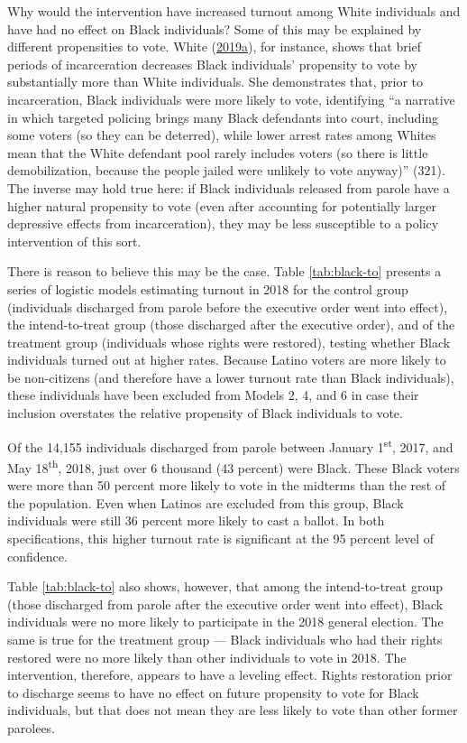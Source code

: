 \documentclass[
  12pt,
]{article}
\begin{document}
Why would the intervention have increased turnout among White individuals and have had no effect on Black individuals? Some of this may be explained by different propensities to vote. White (\protect\hyperlink{ref-White2019}{2019}\protect\hyperlink{ref-White2019}{a}), for instance, shows that brief periods of incarceration decreases Black individuals' propensity to vote by substantially more than White individuals. She demonstrates that, prior to incarceration, Black individuals were more likely to vote, identifying ``a narrative in which targeted policing brings many Black defendants into court, including some voters (so they can be deterred), while lower arrest rates among Whites mean that the White defendant pool rarely includes voters (so there is little demobilization, because the people jailed were unlikely to vote anyway)'' (321). The inverse may hold true here: if Black individuals released from parole have a higher natural propensity to vote (even after accounting for potentially larger depressive effects from incarceration), they may be less susceptible to a policy intervention of this sort.

There is reason to believe this may be the case. Table \ref{tab:black-to} presents a series of logistic models estimating turnout in 2018 for the control group (individuals discharged from parole before the executive order went into effect), the intend-to-treat group (those discharged after the executive order), and of the treatment group (individuals whose rights were restored), testing whether Black individuals turned out at higher rates. Because Latino voters are more likely to be non-citizens (and therefore have a lower turnout rate than Black individuals), these individuals have been excluded from Models 2, 4, and 6 in case their inclusion overstates the relative propensity of Black individuals to vote.



Of the 14,155 individuals discharged from parole between January 1\textsuperscript{st}, 2017, and May 18\textsuperscript{th}, 2018, just over 6 thousand (43 percent) were Black. These Black voters were more than 50 percent more likely to vote in the midterms than the rest of the population. Even when Latinos are excluded from this group, Black individuals were still 36 percent more likely to cast a ballot. In both specifications, this higher turnout rate is significant at the 95 percent level of confidence.

Table \ref{tab:black-to} also shows, however, that among the intend-to-treat group (those discharged from parole after the executive order went into effect), Black individuals were no more likely to participate in the 2018 general election. The same is true for the treatment group --- Black individuals who had their rights restored were no more likely than other individuals to vote in 2018. The intervention, therefore, appears to have a leveling effect. Rights restoration prior to discharge seems to have no effect on future propensity to vote for Black individuals, but that does not mean they are less likely to vote than other former parolees.
\end{document}
